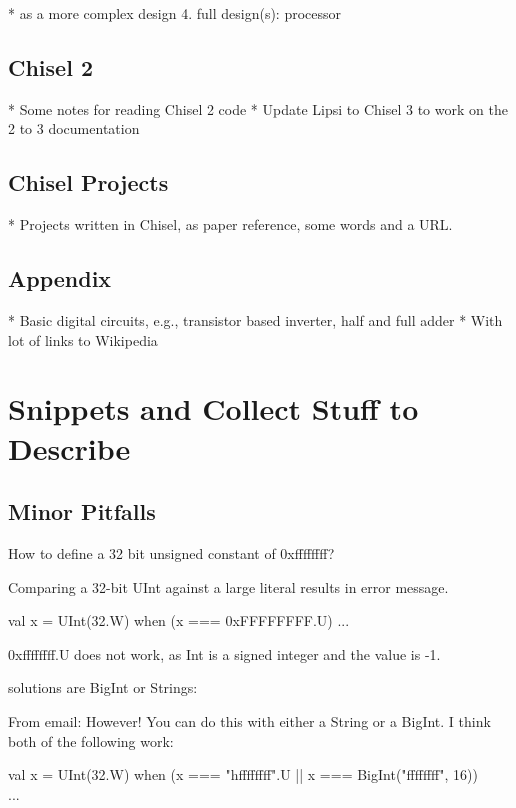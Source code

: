 \documentclass[%
    10pt, %
    headinclude, footexclude,
    openright, %
    notitlepage,
    cleardoubleempty,
    headsepline,
    pointlessnumbers,
    bibtotoc, idxtotoc,
    ]{scrbook}
\begin{document}
  * as a more complex design
  4. full design(s): processor

\section{Chisel 2}

 * Some notes for reading Chisel 2 code
 * Update Lipsi to Chisel 3 to work on the 2 to 3 documentation
 
 \section{Chisel Projects}
 
  * Projects written in Chisel, as paper reference, some words and a URL.

\section{Appendix}

 * Basic digital circuits, e.g., transistor based inverter, half and full adder
 * With lot of links to Wikipedia




\chapter*{Snippets and Collect Stuff to Describe}

\section{Minor Pitfalls}

How to define a 32 bit unsigned constant of 0xffffffff?

Comparing a 32-bit UInt against a large literal results in error message.

val x = UInt(32.W)
when (x === 0xFFFFFFFF.U) {
...
}


0xffffffff.U does not work, as Int is a signed integer and the value is -1.

solutions are BigInt or Strings:

From email: However! You can do this with either a String or a BigInt. I think both of the following work:

val x = UInt(32.W)
when (x === "hffffffff".U || x === BigInt("ffffffff", 16)) {
  \\...
}
\end{document}
